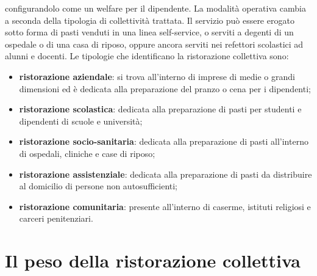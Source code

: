 \documentclass[a4paper, titlepage, 12pt, openright, oneside]{book}
\begin{document}
\begin{itemize}
											configurandolo come un welfare per il dipendente. La modalità operativa cambia a seconda della tipologia di collettività trattata.
											Il servizio può essere erogato sotto forma di pasti venduti in una linea self-service, o serviti a degenti di un ospedale o di una
											casa di riposo, oppure ancora serviti nei refettori scolastici ad alunni e docenti.
											Le tipologie che identificano la ristorazione collettiva sono:
											\begin{itemize}
												\item \textbf{ristorazione aziendale}: si trova all'interno di imprese di medie o grandi dimensioni ed è dedicata alla preparazione
																						del pranzo o cena per i dipendenti;
												\item \textbf{ristorazione scolastica}: dedicata alla preparazione di pasti per studenti e dipendenti di scuole e università;
												\item \textbf{ristorazione socio-sanitaria}: dedicata alla preparazione di pasti all'interno di ospedali, cliniche e case di riposo;
												\item \textbf{ristorazione assistenziale}: dedicata alla preparazione di pasti da distribuire al domicilio di persone 
																							non autosufficienti;
												\item \textbf{ristorazione comunitaria}: presente all'interno di caserme, istituti religiosi e carceri penitenziari.
											\end{itemize}
\end{itemize}

\section{Il peso della ristorazione collettiva}
\end{document}
